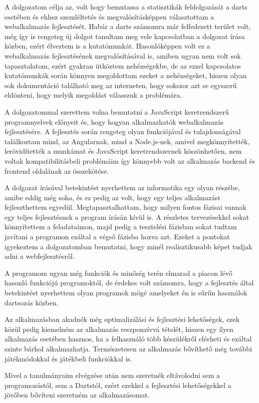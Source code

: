 
A dolgozatom célja az, volt hogy bemutassa a statisztikák feldolgozását a darts esetében és ehhez szemléltetés és megvalósításképpen választottam a webalkalmazás fejlesztését. Habár a darts számomra már felfedezett terület volt, még így is rengeteg új dolgot tanultam meg vele kapcsolatban a dolgozat írása közben, ezért élveztem is a kutatómunkát. Hasonlóképpen volt ez a webalkalmazás fejlesztésének megvalósításával is, amiben ugyan nem volt sok tapasztalatom, ezért gyakran ütköztem nehézségekbe, de az ezzel kapcsolatos kutatómunkák során könnyen megoldottam ezeket a nehézségeket, hiszen olyan sok dokumentáció található meg az interneten, hogy sokszor azt se egyszerű eldönteni, hogy melyik megoldást válasszuk a problémára.

A dolgozatommal szerettem volna bemutatni a JavaScript keretrendszerű programnyelvek előnyeit és, hogy hogyan alkalmazhatók webalkalmazás fejlesztésére. A fejlesztés során rengeteg olyan funkciójával és tulajdonságával találkoztam mind, az Angularnak, mind a Node.js-nek, amivel megkönnyítették, lerövidítették a munkámat és JavaScript keretrendszernek köszönhetően, nem voltak kompatibilitásbeli problémáim így könnyebb volt az alkalmazás backend és frontend oldalának az összekötése. 

A dolgozat írásával betekintést nyerhettem az informatika egy olyan részébe, amibe eddig még soha, és ez pedig az volt, hogy egy teljes alkalmazást fejleszthettem egyedül. Megtapasztalhattam, hogy milyen fontos fázisai vannak egy teljes fejlesztésnek a program írásán kívül is. A részletes tervezésekkel sokat könnyítettem a feladataimon, majd pedig a tesztelési fázisban sokat tudtam javítani a programon ezáltal a végső fázisba hozva azt. Ezeket a pontokat igyekeztem a dolgozatomban bemutatni, hogy minél realisztikusabb képet tudjak adni a webfejlesztésről.

A programom ugyan még funkciók és minőség terén elmarad a piacon lévő hasonló funkciójú programoktól, de érdekes volt számomra, hogy a fejlesztés által betekintést nyerhettem olyan programok mögé amelyeket én is sűrűn használok dartsozás közben.

Az alkalmazásban akadnék még optimalizálási és fejlesztési lehetőségek, ezek közül pedig kiemelném az alkalmazás reszponzívvá tételét, hiszen egy ilyen alkalmazás esetében hasznos, ha a felhasználó több készülékről elérheti és ezáltal szinte bárhol alkalmazhatja. Természetesen az alkalmazás bővíthető még további játékmódokkal és játékbeli funkciókkal is.

Mivel a tanulmányaim elvégzése után nem szeretnék eltávolodni sem a programozástól, sem a Dartstól, ezért ezekkel a fejlesztési lehetőségekkel a jövőben bővíteni szeretném az alkalmazásomat. 
